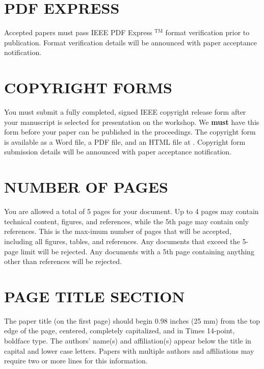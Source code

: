 \documentclass{article}
\begin{document}
\begin{sloppy}
\section{PDF EXPRESS}
\label{sec:PDF_express}

Accepted papers must pass IEEE PDF Express $^{\text{TM}}$ format 
verification prior to publication.  Format verification details will be 
announced with paper acceptance notification.

\section{COPYRIGHT FORMS}
\label{sec:copyright}

You must submit a fully completed, signed IEEE 
copyright release form after your manuscript is
selected for presentation on the workshop.
We {\bf must} have this form before your paper can be
published in the proceedings. The copyright form is 
available as a Word file, a PDF file, and an HTML file
at \cite{ieeecopyright}.
Copyright form submission details will be announced with paper acceptance notification.

\section{NUMBER OF PAGES}
\label{sec:pagelimit}

You are allowed a total of 5 pages for your document. Up to 4 pages may 
contain technical content, figures, and references, while the 5th page 
may contain only references. This is the max-imum number of pages that 
will be accepted, including all figures, tables, and references. Any 
documents that exceed the 5-page limit will be rejected. Any documents 
with a 5th page containing anything other than references will be rejected.


\section{PAGE TITLE SECTION}
\label{sec:pagestyle}

The paper title (on the first page) should begin 0.98 inches 
(25 mm) from the top edge of the page, centered, completely 
capitalized, and in Times 14-point, boldface type.  
The authors' name(s) and affiliation(s) appear below the title
in capital and lower case letters.  Papers with multiple authors 
and affiliations may require two or more lines for this information.


\end{sloppy}
\end{document}
